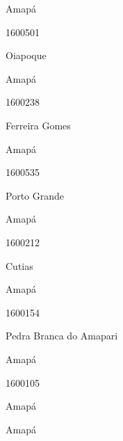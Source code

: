\documentclass[
  letterpaper,
]{report}
\begin{document}
\n    

\n    

\n      

Amapá

\n      

1600501

\n      

Oiapoque

\n    

\n    

\n      

Amapá

\n      

1600238

\n      

Ferreira Gomes

\n    

\n    

\n      

Amapá

\n      

1600535

\n      

Porto Grande

\n    

\n    

\n      

Amapá

\n      

1600212

\n      

Cutias

\n    

\n    

\n      

Amapá

\n      

1600154

\n      

Pedra Branca do Amapari

\n    

\n    

\n      

Amapá

\n      

1600105

\n      

Amapá

\n    

\n    

\n      

Amapá

\n      
\end{document}

